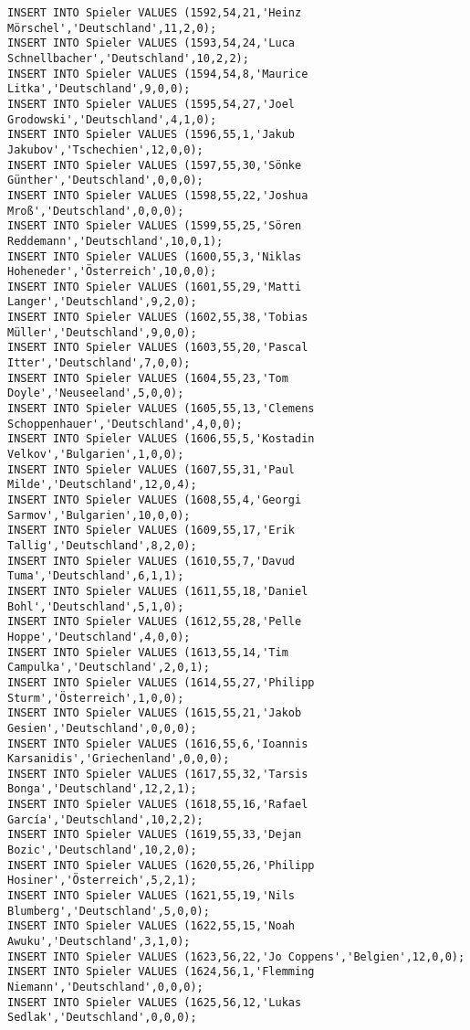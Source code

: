 \documentclass{lehramt-informatik-aufgabe}
\begin{document}
\begin{verbatim}
INSERT INTO Spieler VALUES (1592,54,21,'Heinz Mörschel','Deutschland',11,2,0);
INSERT INTO Spieler VALUES (1593,54,24,'Luca Schnellbacher','Deutschland',10,2,2);
INSERT INTO Spieler VALUES (1594,54,8,'Maurice Litka','Deutschland',9,0,0);
INSERT INTO Spieler VALUES (1595,54,27,'Joel Grodowski','Deutschland',4,1,0);
INSERT INTO Spieler VALUES (1596,55,1,'Jakub Jakubov','Tschechien',12,0,0);
INSERT INTO Spieler VALUES (1597,55,30,'Sönke Günther','Deutschland',0,0,0);
INSERT INTO Spieler VALUES (1598,55,22,'Joshua Mroß','Deutschland',0,0,0);
INSERT INTO Spieler VALUES (1599,55,25,'Sören Reddemann','Deutschland',10,0,1);
INSERT INTO Spieler VALUES (1600,55,3,'Niklas Hoheneder','Österreich',10,0,0);
INSERT INTO Spieler VALUES (1601,55,29,'Matti Langer','Deutschland',9,2,0);
INSERT INTO Spieler VALUES (1602,55,38,'Tobias Müller','Deutschland',9,0,0);
INSERT INTO Spieler VALUES (1603,55,20,'Pascal Itter','Deutschland',7,0,0);
INSERT INTO Spieler VALUES (1604,55,23,'Tom Doyle','Neuseeland',5,0,0);
INSERT INTO Spieler VALUES (1605,55,13,'Clemens Schoppenhauer','Deutschland',4,0,0);
INSERT INTO Spieler VALUES (1606,55,5,'Kostadin Velkov','Bulgarien',1,0,0);
INSERT INTO Spieler VALUES (1607,55,31,'Paul Milde','Deutschland',12,0,4);
INSERT INTO Spieler VALUES (1608,55,4,'Georgi Sarmov','Bulgarien',10,0,0);
INSERT INTO Spieler VALUES (1609,55,17,'Erik Tallig','Deutschland',8,2,0);
INSERT INTO Spieler VALUES (1610,55,7,'Davud Tuma','Deutschland',6,1,1);
INSERT INTO Spieler VALUES (1611,55,18,'Daniel Bohl','Deutschland',5,1,0);
INSERT INTO Spieler VALUES (1612,55,28,'Pelle Hoppe','Deutschland',4,0,0);
INSERT INTO Spieler VALUES (1613,55,14,'Tim Campulka','Deutschland',2,0,1);
INSERT INTO Spieler VALUES (1614,55,27,'Philipp Sturm','Österreich',1,0,0);
INSERT INTO Spieler VALUES (1615,55,21,'Jakob Gesien','Deutschland',0,0,0);
INSERT INTO Spieler VALUES (1616,55,6,'Ioannis Karsanidis','Griechenland',0,0,0);
INSERT INTO Spieler VALUES (1617,55,32,'Tarsis Bonga','Deutschland',12,2,1);
INSERT INTO Spieler VALUES (1618,55,16,'Rafael García','Deutschland',10,2,2);
INSERT INTO Spieler VALUES (1619,55,33,'Dejan Bozic','Deutschland',10,2,0);
INSERT INTO Spieler VALUES (1620,55,26,'Philipp Hosiner','Österreich',5,2,1);
INSERT INTO Spieler VALUES (1621,55,19,'Nils Blumberg','Deutschland',5,0,0);
INSERT INTO Spieler VALUES (1622,55,15,'Noah Awuku','Deutschland',3,1,0);
INSERT INTO Spieler VALUES (1623,56,22,'Jo Coppens','Belgien',12,0,0);
INSERT INTO Spieler VALUES (1624,56,1,'Flemming Niemann','Deutschland',0,0,0);
INSERT INTO Spieler VALUES (1625,56,12,'Lukas Sedlak','Deutschland',0,0,0);

\end{verbatim}
\end{document}

